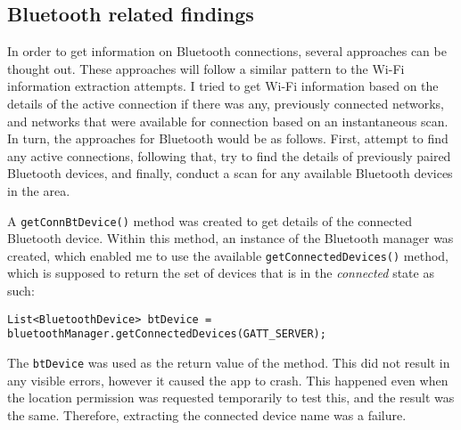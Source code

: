 \documentclass[
  a4paper,  %
  twoside,  %
  bibliography=totoc,
  headsepline,
  cleardoublepage=empty,
  parskip=half,
  draft=false,
  open=any
]{scrbook}
\begin{document}
\subsection{Bluetooth related findings}
In order to get information on Bluetooth connections, several approaches can be thought out. These approaches will follow a similar pattern to the Wi-Fi information extraction attempts. I tried to get Wi-Fi information based on the details of the active connection if there was any, previously connected networks, and networks that were available for connection based on an instantaneous scan. In turn, the approaches for Bluetooth would be as follows. First, attempt to find any active connections, following that, try to find the details of previously paired Bluetooth devices, and finally, conduct a scan for any available Bluetooth devices in the area.

A \texttt{getConnBtDevice()} method was created to get details of the connected Bluetooth device. Within this method, an instance of the Bluetooth manager was created, which enabled me to use the available \texttt{getConnectedDevices()} method, which is supposed to return the set of devices that is in the \textit{connected} state as such:
\begin{lstlisting}
List<BluetoothDevice> btDevice = bluetoothManager.getConnectedDevices(GATT_SERVER);
\end{lstlisting}
The \texttt{btDevice} was used as the return value of the method. This did not result in any visible errors, however it caused the app to crash. This happened even when the location permission was requested temporarily to test this, and the result was the same. Therefore, extracting the connected device name was a failure. 
\end{document}
